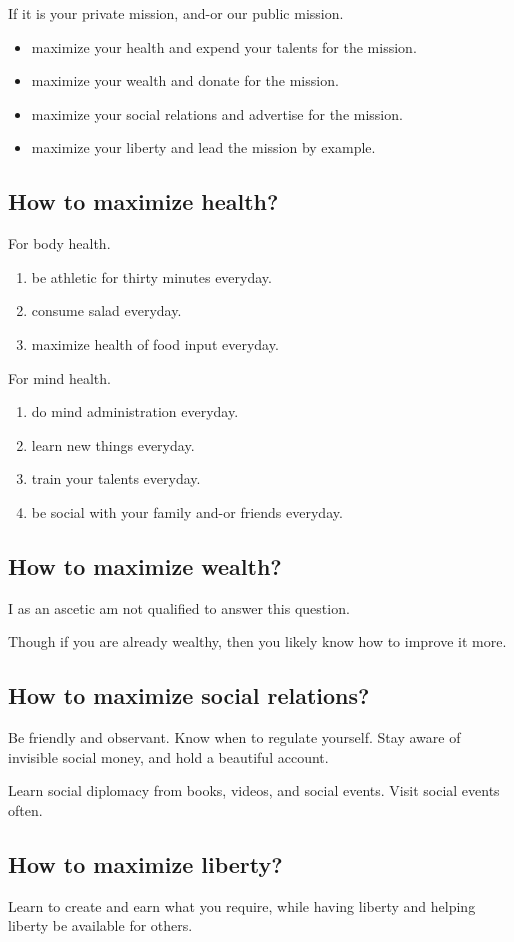 \documentclass{report}
\begin{document}
If it is your private mission, and-or our public mission.

\begin{itemize}
  \item maximize your health and expend your talents for the mission.
  \item maximize your wealth and donate for the mission.
  \item maximize your social relations and advertise for  the mission.
  \item maximize your liberty and lead the mission by example.
\end{itemize}

\subsection{How to maximize health?}

For body health.
\begin{enumerate}
  \item be athletic for thirty minutes everyday.
  \item consume salad everyday.
  \item maximize health of food input everyday.
\end{enumerate}

For mind health.
\begin{enumerate}
  \item do mind administration everyday.
  \item learn new things everyday.
  \item train your talents everyday.
  \item be social with your family and-or friends everyday.
\end{enumerate}

\subsection{How to maximize wealth?}

I as an ascetic am not qualified to answer this question. 

Though if you are already wealthy, 
then you likely know how to improve it more.

\subsection{How to maximize social relations?}

Be friendly and observant.
Know when to regulate yourself.
Stay aware of invisible social money, 
and hold a beautiful account.

Learn social diplomacy from books, videos, and social events.
Visit social events often.

\subsection{How to maximize liberty?}

Learn to create and earn what you require,
while having liberty and helping liberty be available for others.
\end{document}
